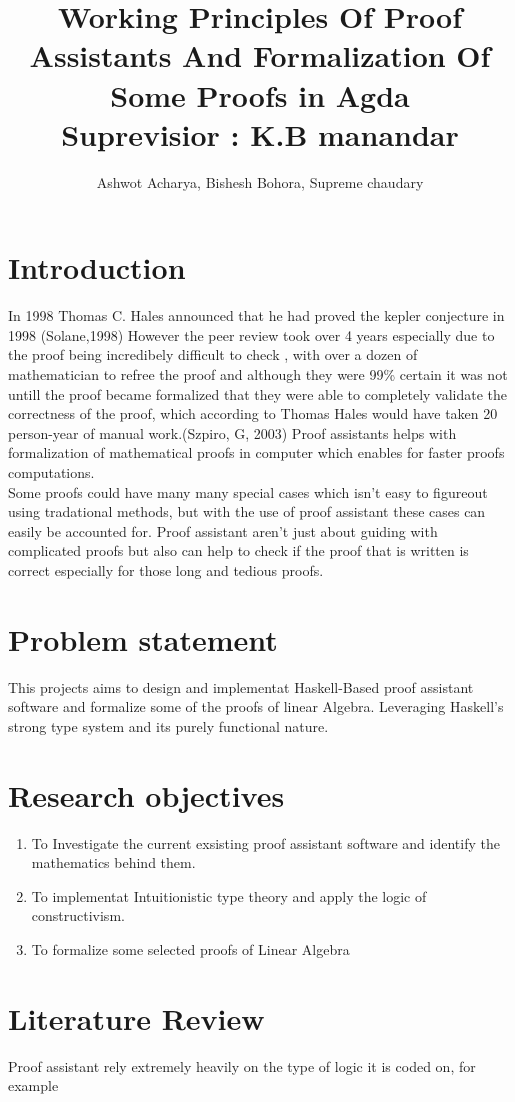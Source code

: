 \documentclass{article}
\title{
    {Working Principles Of Proof Assistants And Formalization Of Some Proofs in Agda}\\
    {\large Suprevisior : K.B manandar}\\


    }
\author{ Ashwot Acharya, Bishesh Bohora, Supreme chaudary}
\begin{document}
\maketitle

\pagebreak
\section{Introduction}
In 1998 Thomas C. Hales announced that he had proved the kepler conjecture in 1998 (Solane,1998) However the peer review took over 4 years especially due to the proof being incredibely difficult to check , with over a dozen of mathematician to refree the proof and although 
they were 99\% certain it was not untill the proof became formalized that they were able to completely validate the correctness of the proof, which according to Thomas Hales would have taken 20 person-year of manual work.(Szpiro, G, 2003)
Proof assistants helps with formalization of mathematical proofs in computer which enables for faster proofs computations.\\
Some proofs could have many many special cases which isn't easy to figureout using tradational methods, but with the use of proof assistant these cases can easily be accounted for.
Proof assistant aren't just about guiding with complicated proofs but also can help to check if the proof that is written is correct especially for those long and tedious proofs.


\section{Problem statement}
This projects aims to design and implementat Haskell-Based proof assistant software and formalize some  of the proofs of linear Algebra. Leveraging Haskell's strong type system and its purely functional nature.
\section{Research objectives}
\begin{enumerate}
    \item To Investigate the current exsisting proof assistant software and identify the mathematics behind them.
    \item To implementat Intuitionistic type theory and apply the logic of constructivism.
    \item To formalize some selected proofs of Linear Algebra
\end{enumerate}
\section{Literature Review}
Proof assistant rely extremely heavily on the type of logic it is coded on, for example 
\end{document}
